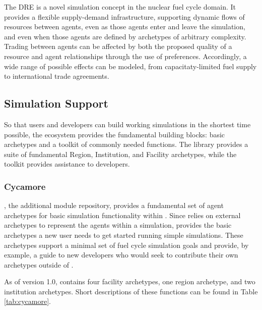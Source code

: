 The \gls{DRE} is a novel simulation concept in the nuclear fuel cycle domain. It
provides a flexible supply-demand infrastructure, supporting dynamic flows of
resources between agents, even as those agents enter and leave the simulation, and
even when those agents are defined by archetypes of arbitrary complexity. Trading
between agents can be affected by both the
proposed quality of a resource and agent relationships through the use of
preferences. Accordingly, a wide range of possible effects can be
modeled, from capacitaty-limited fuel supply to international trade agreements.

\subsection{Simulation Support}
So that users and developers can build working simulations
in the shortest time possible, the \Cyclus ecosystem provides the fundamental
building blocks: basic archetypes and a toolkit of commonly needed functions.
The \Cycamore library provides a suite of fundamental Region, Institution, and
Facility archetypes, while the \Cyclus toolkit provides assistance to
developers.

\subsubsection{Cycamore}

\Cycamore \cite{carlsen_cycamore_2014}, the \Cyclus additional module
repository, provides a fundamental set of agent archetypes for basic simulation
functionality within \Cyclus.  Since \Cyclus relies on external
archetypes to represent the agents within a simulation, \Cycamore provides the
basic archetypes a new user needs to get started running simple simulations.
These archetypes support a minimal set of fuel cycle simulation goals and
provide, by example, a guide to new developers who would seek to contribute
their own archetypes outside of \Cycamore.

As of version 1.0, \Cycamore contains four facility archetypes, one region
archetype, and two institution archetypes. Short descriptions of these
functions can be found in Table \ref{tab:cycamore}.


